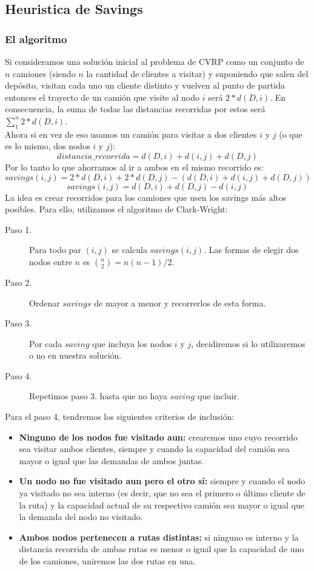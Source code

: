 \subsection{Heuristica de Savings}
\subsubsection{El algoritmo}
Si consideramos una solución inicial al problema de CVRP como un conjunto de $n$ camiones (siendo $n$ la cantidad de clientes a visitar) y suponiendo que salen del depósito, visitan cada uno un cliente distinto y vuelven al punto de partida entonces el trayecto de un camión que visite al nodo $i$ será $2*d(D,i)$. En consecuencia, la suma de todas las distancias recorridas por estos será $\sum_{1}^{n} 2*d(D, i)$.\\
Ahora si en vez de eso usamos un camión para visitar a dos clientes $i$ y $j$ (o que es lo mismo, dos nodos $i$ y $j$):
$$ distancia\_recorrida = d(D, i) + d(i,j) +d(D, j)     $$
Por lo tanto lo que ahorramos al ir a ambos en el mismo recorrido es:\\
$$ savings(i,j) = 2*d(D, i) + 2* d(D,j) -  (d(D, i) + d(i,j) +d(D, j))     $$
$$ savings(i,j) = d(D, i) + d(D,j) -   d(i,j)    $$
La idea es crear recorridos para los camiones que usen los savings más altos posibles. Para ello, utilizamos el algoritmo de Clark-Wright:

\begin{description}
	\item[Paso 1.] Para todo par $(i,j)$ se calcula $savings(i,j)$. Las formas de elegir dos nodos entre $n$ es ${n}\choose{2}$$ = n(n-1)/2$.
	\item[Paso 2.] Ordenar $savings$ de mayor a menor y recorrerlos de esta forma.
	\item[Paso 3.] Por cada $saving$ que incluya los nodos $i$ y $j$, decidiremos si lo utilizaremos o no en nuestra solución.
	\item[Paso 4.] Repetimos paso 3. hasta que no haya $saving$ que incluir.
\end{description}
Para el paso 4, tendremos los siguientes criterios de inclusión:
\begin{itemize}
	\item \textbf{Ninguno de los nodos fue visitado aun:} crearemos uno cuyo recorrido sea visitar ambos clientes, siempre y cuando la capacidad del camión sea mayor o igual que las demandas de ambos juntas.
	\item \textbf{Un nodo no fue visitado aun pero el otro sí:} siempre y cuando el nodo ya visitado no sea interno (es decir, que no sea el primero o último cliente de la ruta) y la capacidad actual de su respectivo camión sea mayor o igual que la demanda del nodo no visitado.
	\item \textbf{Ambos nodos pertenecen a rutas distintas:} si ninguno es interno y la distancia recorrida de ambas rutas es menor o igual que la capacidad de uno de los camiones, uniremos las dos rutas en una.
\end{itemize}


